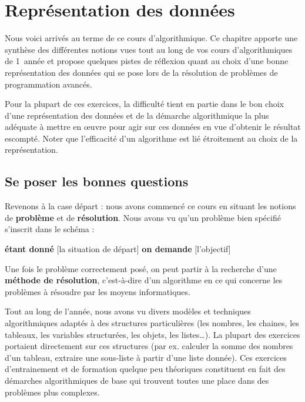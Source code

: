 \chapter{Représentation des données%
}

Nous voici arrivés au terme de ce cours d'algorithmique. 
Ce chapitre apporte une synthèse des différentes notions vues 
tout au long de vos cours d'algorithmiques de 1\iere\ année 
et propose quelques pistes de réflexion 
quant au choix d’une bonne représentation des données 
qui se pose lors de la résolution de problèmes de programmation avancés.

Pour la plupart de ces exercices,
la difficulté tient en partie dans le bon choix d’une représentation des données 
et de la démarche algorithmique la plus adéquate à mettre en œuvre pour agir sur ces
données en vue d’obtenir le résultat escompté. Noter que l’efficacité
d’un algorithme est lié étroitement au choix de la représentation.

\section{Se poser les bonnes questions}

Revenons à la case départ : nous avons commencé ce cours en situant les
notions de \textbf{problème} et de \textbf{résolution}. Nous avons vu
qu’un problème bien spécifié s’inscrit dans le schéma :

	\begin{center}
	\begin{Ovalbox}
		{\textbf{étant donné} [la situation de départ] 
		\textbf{on demande} [l’objectif]}
	\end{Ovalbox}
	\end{center}

Une fois le problème correctement posé, on peut partir à la recherche
d’une \textbf{méthode de résolution}, c’est-à-dire d’un algorithme en
ce qui concerne les problèmes à résoudre par les moyens informatiques.

Tout au long de l’année, nous avons vu divers modèles et techniques
algorithmiques adaptés à des structures particulières (les nombres,
les chaines, les tableaux, les variables structurées, les objets, les
listes\dots). La plupart des exercices portaient directement
sur ces structures (par ex. calculer la somme des nombres d’un tableau,
extraire une sous-liste à partir
d’une liste donnée). Ces exercices d’entrainement et de formation
quelque peu théoriques constituent en fait des démarches algorithmiques
de base qui trouvent toutes une place dans des problèmes plus
complexes.

